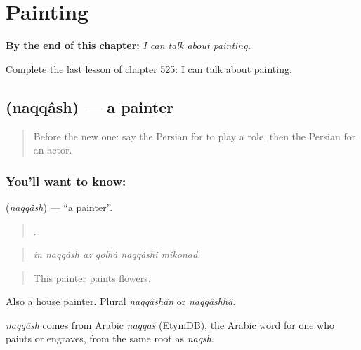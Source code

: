 
\chapter{Painting}
\label{ch:fa-painting}

\begin{chapteropening}
\textbf{By the end of this chapter:} \emph{I can talk about painting.}

Complete the last lesson of chapter 525: I can talk about painting.
\end{chapteropening}

\section[\texorpdfstring{\fa{نقاش} (naqqâsh)}{نقاش (naqqâsh)}]{ (naqqâsh) — a painter}

\label{lesson:FA-C525-naqqash}



\begin{quote}
Before the new one: say the Persian for to play a role, then the Persian for an actor.
\end{quote}

\subsection*{You'll want to know: }
\textbf{} (\emph{naqqâsh}) — \textquotedblleft{}a painter\textquotedblright{}.

\begin{quote}
     .
\end{quote}

\begin{quote}
\emph{in naqqâsh az golhâ naqqâshi mikonad.}
\end{quote}

\begin{quote}
This painter paints flowers.
\end{quote}

Also a house painter. Plural \emph{naqqâshân} or \emph{naqqâshhâ}.

\begin{cousinweb}
\emph{naqqâsh} comes from Arabic \emph{naqqāš} (EtymDB), the Arabic word for one who paints or engraves, from the same root as \emph{naqsh}.
\end{cousinweb}

